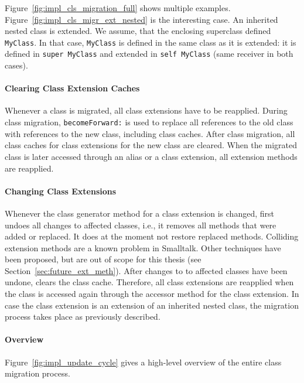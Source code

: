 Figure~\ref{fig:impl_cls_migration_full} shows multiple examples. Figure~\ref{fig:impl_cls_migr_ext_nested} is the interesting case. An inherited nested class is extended. We assume, that the enclosing superclass defined \texttt{MyClass}. In that case, \texttt{MyClass} is defined in the same class as it is extended: it is defined in \texttt{super MyClass} and extended in \texttt{self MyClass} (same receiver in both cases).

\paragraph{Clearing Class Extension Caches}
Whenever a class is migrated, all class extensions have to be reapplied. During class migration, \texttt{becomeForward:} is used to replace all references to the old class with references to the new class, including class caches. After class migration, all class caches for class extensions for the new class are cleared. When the migrated class is later accessed through an alias or a class extension, all extension methods are reapplied.

\paragraph{Changing Class Extensions}
Whenever the class generator method for a class extension is changed, \msname first undoes all changes to affected classes, i.e., it removes all methods that were added or replaced. It does at the moment not restore replaced methods. Colliding extension methods are a known problem in Smalltalk. Other techniques have been proposed, but are out of scope for this thesis (see Section~\ref{sec:future_ext_meth}). After changes to to affected classes have been undone, \msname clears the class cache. Therefore, all class extensions are reapplied when the class is accessed again through the accessor method for the class extension. In case the class extension is an extension of an inherited nested class, the migration process takes place as previously described.

\paragraph{Overview}
Figure~\ref{fig:impl_update_cycle} gives a high-level overview of the entire class migration process.

